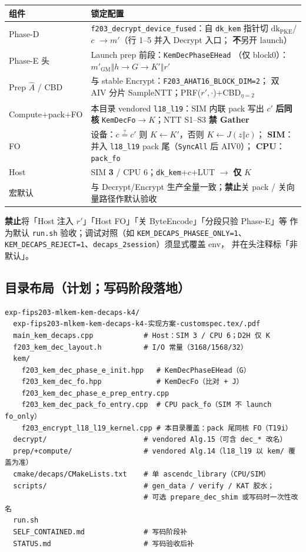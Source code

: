 \documentclass[UTF8,a4paper,11pt]{ctexart}
\begin{document}
\begin{longtable}{@{}L{4.2cm}L{8.8cm}@{}}
\toprule
组件 & 锁定配置 \\
\midrule
Phase-D &
  \texttt{f203\_decrypt\_device\_fused}：自 \texttt{dk\_kem} 指针切
  $\mathrm{dk}_{\mathrm{PKE}}$/$c$ $\to m'$（行 1--5 并入 Decrypt 入口；
  \textbf{不}另开 launch） \\
Phase-E 头 & Launch prep 前段：\texttt{KemDecPhaseEHead}
         （仅 block0）：$m'_{\mathrm{GM}}\Vert h\to G\to K'\Vert r'$ \\
Prep $\hat{A}$ / CBD & 与 stable Encrypt：\texttt{F203\_AHAT16\_BLOCK\_DIM=2}；
               双 AIV 分片 SampleNTT；PRF($r',\cdot$)+CBD$_{\eta=2}$ \\
Compute+pack+FO & 本目录 vendored \texttt{l18\_l19}：SIM 内联 pack 写出 $c'$
               \textbf{后同核} \texttt{KemDecFo}$\to K$；NTT S1--S3 \textbf{禁 Gather} \\
FO & 设备：$c\stackrel{?}{=}c'$ 则 $K\leftarrow K'$，否则 $K\leftarrow J(z\Vert c)$；
     \textbf{SIM}：并入 \texttt{l18\_l19} pack 尾（\texttt{SyncAll} 后 AIV0）；
     \textbf{CPU}：\texttt{pack\_fo} \\
Host & SIM \textbf{3} / CPU 6；\texttt{dk\_kem}+$c$+LUT $\to$ \textbf{仅} $K$ \\
宏默认 & 与 Decrypt/Encrypt 生产全量一致；\textbf{禁止}关 pack / 关向量路径作默认验收 \\
\bottomrule
\end{longtable}

\textbf{禁止}将「Host 注入 $r'$」「Host FO」「关 ByteEncode」「分段只验 Phase-E」等
作为默认 \texttt{run.sh} 验收；调试对照（如 \texttt{KEM\_DECAPS\_PHASEE\_ONLY=1}、
\texttt{KEM\_DECAPS\_REJECT=1}、\texttt{decaps\_2session}）须显式覆盖 env，
并在头注释标「非默认」。

\subsection{目录布局（计划；写码阶段落地）}

\begin{verbatim}
exp-fips203-mlkem-kem-decaps-k4/
  exp-fips203-mlkem-kem-decaps-k4-实现方案-customspec.tex/.pdf
  main_kem_decaps.cpp            # Host：SIM 3 / CPU 6；D2H 仅 K
  f203_kem_dec_layout.h          # I/O 常量（3168/1568/32）
  kem/
    f203_kem_dec_phase_e_init.hpp   # KemDecPhaseEHead（G）
    f203_kem_dec_fo.hpp             # KemDecFo（比对 + J）
    f203_kem_dec_phase_e_prep_entry.cpp
    f203_kem_dec_pack_fo_entry.cpp  # CPU pack_fo（SIM 不 launch fo_only）
    f203_encrypt_l18_l19_kernel.cpp # 本目录覆盖：pack 尾同核 FO（T19i）
  decrypt/                       # vendored Alg.15（可含 dec_* 改名）
  prep/+compute/                 # vendored Alg.14（l18_l19 以 kem/ 覆盖为准）
  cmake/decaps/CMakeLists.txt    # 单 ascendc_library（CPU/SIM）
  scripts/                       # gen_data / verify / KAT 胶水；
                                 # 可选 prepare_dec_shim 或写码时一次性改名
  run.sh
  SELF_CONTAINED.md              # 写码阶段补
  STATUS.md                      # 写码验收后补
\end{verbatim}
\end{document}
